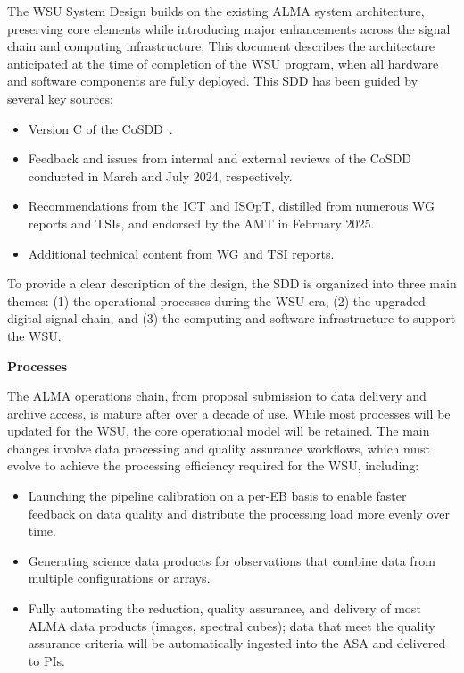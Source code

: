 The WSU System Design builds on the existing ALMA system architecture, preserving core elements while introducing major enhancements across the signal chain and computing infrastructure. This document describes the architecture anticipated at the time of completion of the WSU program, when all hardware and software components are fully deployed. This \acl{SDD} has been guided by several key sources:
\begin{itemize}[itemsep=-0.5em]
\item Version C of the \ac{CoSDD}~\cite{cosdd_c}.
\item Feedback and issues from internal and external reviews of the \ac{CoSDD} conducted in March and July 2024, respectively.
\item Recommendations from the \acl{ICT} and \acl{ISOpT}, distilled from numerous \acl{WG} reports and \acp{TSI}, and endorsed by the \acl{AMT} in February 2025.
\item Additional technical content from \acl{WG} and \ac{TSI} reports.
\end{itemize}

To provide a clear description of the design, the \acl{SDD} is organized into three main themes: (1) the operational processes during the WSU era, (2) the upgraded digital signal chain, and (3) the computing and software infrastructure to support the WSU.

\noindent \textbf{Processes}

The ALMA operations chain, from proposal submission to data delivery and archive access, is mature after over a decade of use. While most processes will be updated for the WSU, the core operational model will be retained. The main changes involve data processing and quality assurance workflows, which must evolve to achieve the processing efficiency required for the WSU, including:

\begin{itemize}[itemsep=-0.5em]
    \item Launching the pipeline calibration on a per-\acl{EB} basis to enable faster feedback on data quality and distribute the processing load more evenly over time. %
    \item Generating science data products %
    for observations that combine data from multiple configurations or arrays.
    \item Fully automating the reduction, quality assurance, and delivery of most ALMA data products (images, spectral cubes); %
    data that meet the quality assurance criteria will be automatically ingested into the \acl{ASA} and delivered to \aclp{PI}.
\end{itemize}


